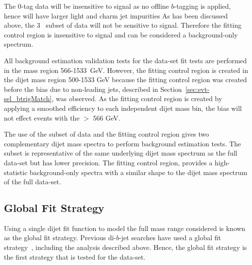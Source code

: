 The 0-tag data will be insensitive to signal as no offline $b$-tagging is applied, hence will have larger light and charm jet impurities
As has been discussed above, the  3~\ifb{} subset of data will not be sensitive to signal.
Therefore the fitting control region is insensitive to signal and can be considered a background-only spectrum.

All background estimation validation tests for the \lm{} data-set fit tests are performed in the mass region 566-1533~GeV.
However, the fitting control region is created in the dijet mass region 500-1533 GeV
because the fitting control region was created before the bias due to non-leading jets, described in Section~\ref{sec:evt-sel_btrigMatch}, was observed.
As the fitting control region is created by applying a smoothed efficiency to each independent dijet mass bin,
the bias will not effect events with the \mjj{} $>$ 566 GeV.

The use of the subset of data and the fitting control region gives two complementary dijet mass spectra to perform background estimation tests.
The subset is representative of the same underlying dijet mass spectrum as the full \lm{} data-set but has lower precision.
The fitting control region, provides a high-statistic background-only spectra with a similar shape to the dijet mass spectrum of the full \lm{} data-set.




\subsection{Global Fit Strategy}
\label{sec:bkg-full_globalFit}

Using a single dijet fit function to model the full mass range considered is known as the global fit strategy.
Previous di-$b$-jet searches have used a global fit strategy~\cite{dibjet-mori16_paper}, including the \summer{} analysis described above.
Hence, the global fit strategy is the first strategy that is tested for the \lm{} data-set.


